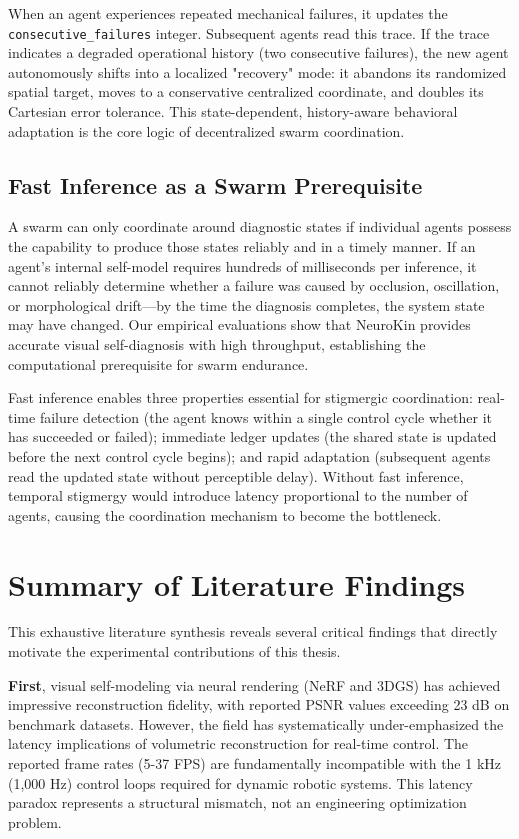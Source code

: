 \documentclass[12pt,a4paper,oneside]{report}
\begin{document}
When an agent experiences repeated mechanical failures, it updates the \texttt{consecutive\_failures} integer. Subsequent agents read this trace. If the trace indicates a degraded operational history (two consecutive failures), the new agent autonomously shifts into a localized "recovery" mode: it abandons its randomized spatial target, moves to a conservative centralized coordinate, and doubles its Cartesian error tolerance. This state-dependent, history-aware behavioral adaptation is the core logic of decentralized swarm coordination.

\subsection{Fast Inference as a Swarm Prerequisite}
\label{subsec:fast_inference_as_a_swarm_prerequisite}

A swarm can only coordinate around diagnostic states if individual agents possess the capability to produce those states reliably and in a timely manner. If an agent's internal self-model requires hundreds of milliseconds per inference, it cannot reliably determine whether a failure was caused by occlusion, oscillation, or morphological drift—by the time the diagnosis completes, the system state may have changed. Our empirical evaluations show that NeuroKin provides accurate visual self-diagnosis with high throughput, establishing the computational prerequisite for swarm endurance.

Fast inference enables three properties essential for stigmergic coordination: real-time failure detection (the agent knows within a single control cycle whether it has succeeded or failed); immediate ledger updates (the shared state is updated before the next control cycle begins); and rapid adaptation (subsequent agents read the updated state without perceptible delay). Without fast inference, temporal stigmergy would introduce latency proportional to the number of agents, causing the coordination mechanism to become the bottleneck.

\section{Summary of Literature Findings}

This exhaustive literature synthesis reveals several critical findings that directly motivate the experimental contributions of this thesis.

\textbf{First}, visual self-modeling via neural rendering (NeRF and 3DGS) has achieved impressive reconstruction fidelity, with reported PSNR values exceeding 23 dB on benchmark datasets. However, the field has systematically under-emphasized the latency implications of volumetric reconstruction for real-time control. The reported frame rates (5-37 FPS) are fundamentally incompatible with the 1 kHz (1,000 Hz) control loops required for dynamic robotic systems. This latency paradox represents a structural mismatch, not an engineering optimization problem.
\end{document}
